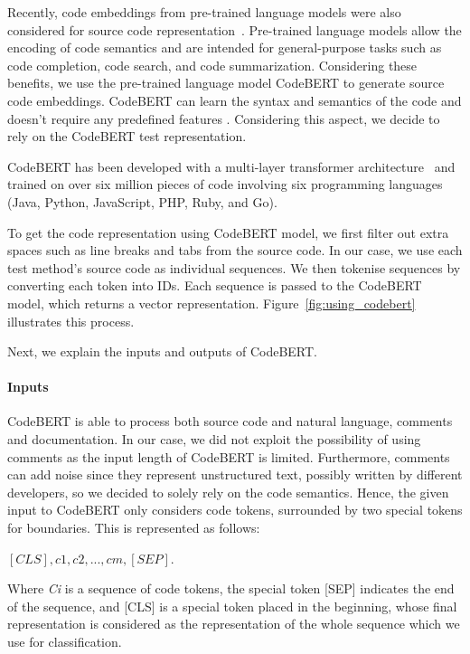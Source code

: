 Recently, code embeddings from pre-trained language models were also considered for source code representation~\cite{fatima2021flakify,zhou2021assessing}. Pre-trained language models allow the encoding of code semantics and are intended for general-purpose tasks such as code completion, code search, and code summarization.
Considering these benefits, we use the pre-trained language model CodeBERT \cite{feng-etal-2020-codebert} to generate source code embeddings. 
CodeBERT can learn the syntax and semantics of the code and doesn't require any predefined features \cite{wan2022they}. Considering this aspect, we decide to rely on the CodeBERT test representation.

CodeBERT has been developed with a multi-layer transformer architecture~\cite{transformer} and trained on over six million pieces of code involving six programming languages (Java, Python, JavaScript, PHP, Ruby, and Go). 

To get the code representation using CodeBERT model, we first filter out extra spaces such as line breaks and tabs from the source code. In our case, we use each test method's source code as individual sequences. We then tokenise sequences by converting each token into IDs. Each sequence is passed to the CodeBERT model, which returns a vector representation. Figure~\ref{fig:using_codebert} illustrates this process.

Next, we explain the inputs and outputs of CodeBERT.

\paragraph{Inputs}
CodeBERT is able to process both source code and natural language, \eg comments and documentation. In our case, we did not exploit the possibility of using comments as the input length of CodeBERT is limited. Furthermore, comments can add noise since they represent unstructured text, possibly written by different developers, so we decided to solely rely on the code semantics. 
Hence, the given input to CodeBERT only considers code tokens, surrounded by two special tokens for boundaries. This is represented as follows: 
\begin{center}
 \([CLS], c1, c2, ..., cm, [SEP]. \)
\end{center}
Where \textit{Ci} is a sequence of code tokens, the special token [SEP] indicates the end of the sequence, and [CLS] is a special token placed in the beginning, whose final representation is considered as the representation of the whole sequence which we use for classification.

